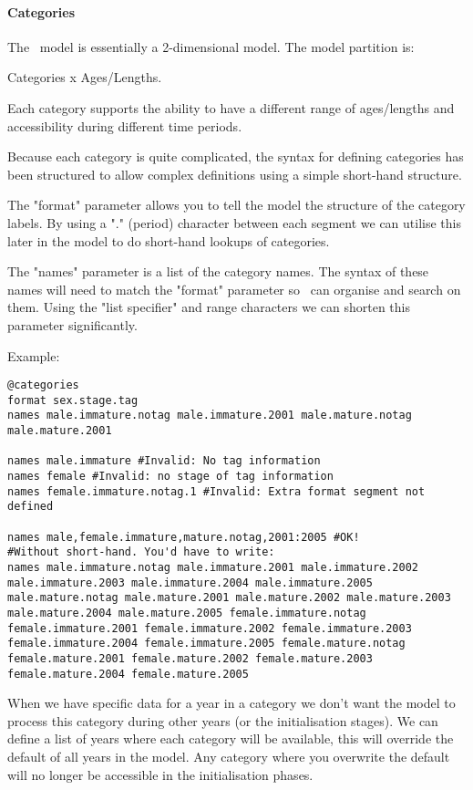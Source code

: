 \paragraph*{Categories}

The \CNAME\ model is essentially a 2-dimensional model. The model partition is:

Categories x Ages/Lengths.

Each category supports the ability to have a different range of ages/lengths and accessibility during different time periods.

Because each category is quite complicated, the syntax for defining categories has been structured to allow complex definitions using a simple short-hand structure.

The "format" parameter allows you to tell the model the structure of the category labels. By using a "." (period) character between each segment we can utilise this later in the model to do short-hand lookups of categories.

The "names" parameter is a list of the category names. The syntax of these names will need to match the "format" parameter so \CNAME\ can organise and search on them. Using the "list specifier" and range characters we can shorten this parameter significantly.

Example:

{\small{\begin{verbatim}
@categories
format sex.stage.tag
names male.immature.notag male.immature.2001 male.mature.notag male.mature.2001

names male.immature #Invalid: No tag information
names female #Invalid: no stage of tag information
names female.immature.notag.1 #Invalid: Extra format segment not defined

names male,female.immature,mature.notag,2001:2005 #OK!
#Without short-hand. You'd have to write:
names male.immature.notag male.immature.2001 male.immature.2002 male.immature.2003 male.immature.2004 male.immature.2005 male.mature.notag male.mature.2001 male.mature.2002 male.mature.2003 male.mature.2004 male.mature.2005 female.immature.notag female.immature.2001 female.immature.2002 female.immature.2003 female.immature.2004 female.immature.2005 female.mature.notag female.mature.2001 female.mature.2002 female.mature.2003 female.mature.2004 female.mature.2005
\end{verbatim}}}

When we have specific data for a year in a category we don't want the model to process this category during other years (or the initialisation stages). We can define a list of years where each category will be available, this will override the default of all years in the model. Any category where you overwrite the default will no longer be accessible in the initialisation phases.

